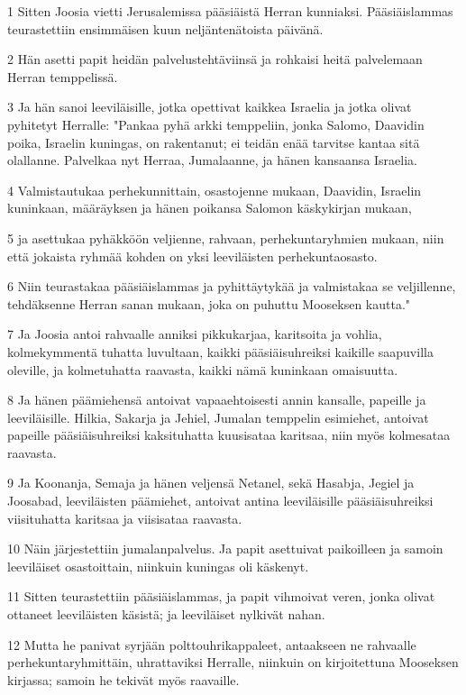 \par 1 Sitten Joosia vietti Jerusalemissa pääsiäistä Herran kunniaksi. Pääsiäislammas teurastettiin ensimmäisen kuun neljäntenätoista päivänä.
\par 2 Hän asetti papit heidän palvelustehtäviinsä ja rohkaisi heitä palvelemaan Herran temppelissä.
\par 3 Ja hän sanoi leeviläisille, jotka opettivat kaikkea Israelia ja jotka olivat pyhitetyt Herralle: "Pankaa pyhä arkki temppeliin, jonka Salomo, Daavidin poika, Israelin kuningas, on rakentanut; ei teidän enää tarvitse kantaa sitä olallanne. Palvelkaa nyt Herraa, Jumalaanne, ja hänen kansaansa Israelia.
\par 4 Valmistautukaa perhekunnittain, osastojenne mukaan, Daavidin, Israelin kuninkaan, määräyksen ja hänen poikansa Salomon käskykirjan mukaan,
\par 5 ja asettukaa pyhäkköön veljienne, rahvaan, perhekuntaryhmien mukaan, niin että jokaista ryhmää kohden on yksi leeviläisten perhekuntaosasto.
\par 6 Niin teurastakaa pääsiäislammas ja pyhittäytykää ja valmistakaa se veljillenne, tehdäksenne Herran sanan mukaan, joka on puhuttu Mooseksen kautta."
\par 7 Ja Joosia antoi rahvaalle anniksi pikkukarjaa, karitsoita ja vohlia, kolmekymmentä tuhatta luvultaan, kaikki pääsiäisuhreiksi kaikille saapuvilla oleville, ja kolmetuhatta raavasta, kaikki nämä kuninkaan omaisuutta.
\par 8 Ja hänen päämiehensä antoivat vapaaehtoisesti annin kansalle, papeille ja leeviläisille. Hilkia, Sakarja ja Jehiel, Jumalan temppelin esimiehet, antoivat papeille pääsiäisuhreiksi kaksituhatta kuusisataa karitsaa, niin myös kolmesataa raavasta.
\par 9 Ja Koonanja, Semaja ja hänen veljensä Netanel, sekä Hasabja, Jegiel ja Joosabad, leeviläisten päämiehet, antoivat antina leeviläisille pääsiäisuhreiksi viisituhatta karitsaa ja viisisataa raavasta.
\par 10 Näin järjestettiin jumalanpalvelus. Ja papit asettuivat paikoilleen ja samoin leeviläiset osastoittain, niinkuin kuningas oli käskenyt.
\par 11 Sitten teurastettiin pääsiäislammas, ja papit vihmoivat veren, jonka olivat ottaneet leeviläisten käsistä; ja leeviläiset nylkivät nahan.
\par 12 Mutta he panivat syrjään polttouhrikappaleet, antaakseen ne rahvaalle perhekuntaryhmittäin, uhrattaviksi Herralle, niinkuin on kirjoitettuna Mooseksen kirjassa; samoin he tekivät myös raavaille.
